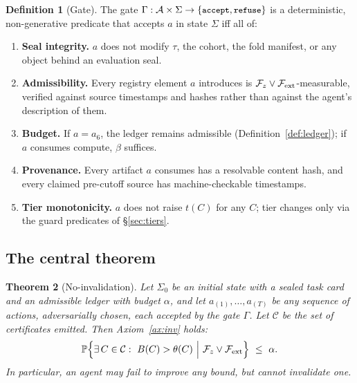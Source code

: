 \documentclass[11pt,a4paper]{article}
\newtheorem{theorem}{Theorem}[section]
\theoremstyle{definition}
\newtheorem{definition}[theorem]{Definition}
\theoremstyle{remark}
\newcommand{\Prob}{\mathbb{P}}
\newcommand{\Fcal}{\mathcal{F}}
\newcommand{\Acal}{\mathcal{A}}
\newcommand{\code}[1]{\texttt{\small#1}}
\begin{document}
\begin{definition}[Gate]\label{def:gate}
The gate $\Gamma:\Acal\times\Sigma\to\{\code{accept},\code{refuse}\}$ is a deterministic, non-generative predicate that accepts $a$ in state $\Sigma$ iff all of:
\begin{enumerate}\itemsep0pt
\item[(G1)] \textbf{Seal integrity.} $a$ does not modify $\tau$, the cohort, the fold manifest, or any object behind an evaluation seal.
\item[(G2)] \textbf{Admissibility.} Every registry element $a$ introduces is $\Fcal_z\vee\Fcal_{\rm ext}$-measurable, verified against source timestamps and hashes rather than against the agent's description of them.
\item[(G3)] \textbf{Budget.} If $a=a_6$, the ledger remains admissible (Definition~\ref{def:ledger}); if $a$ consumes compute, $\beta$ suffices.
\item[(G4)] \textbf{Provenance.} Every artifact $a$ consumes has a resolvable content hash, and every claimed pre-cutoff source has machine-checkable timestamps.
\item[(G5)] \textbf{Tier monotonicity.} $a$ does not raise $t(C)$ for any $C$; tier changes only via the guard predicates of \S\ref{sec:tiers}.
\end{enumerate}
\end{definition}

\subsection{The central theorem}

\begin{theorem}[No-invalidation]\label{thm:noinval}
Let $\Sigma_0$ be an initial state with a sealed task card and an admissible ledger with budget $\alpha$, and let $a_{(1)},\dots,a_{(T)}$ be \emph{any} sequence of actions, adversarially chosen, each accepted by the gate $\Gamma$. Let $\mathcal{C}$ be the set of certificates emitted. Then Axiom~\ref{ax:inv} holds:
\[
\Prob\Big\{\exists\,C\in\mathcal{C}:\ B(C)>\theta(C)\ \Big|\ \Fcal_z\vee\Fcal_{\rm ext}\Big\}\ \le\ \alpha .
\]
In particular, an agent may fail to improve any bound, but cannot invalidate one.
\end{theorem}
\end{document}
